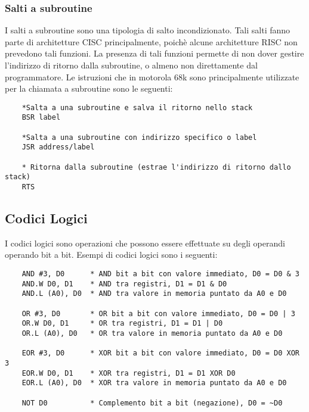 \newpage

\subsubsection{Salti a subroutine}
I salti a subroutine sono una tipologia di salto incondizionato. Tali salti fanno parte di architetture CISC principalmente, poichè alcune architetture RISC non prevedono tali funzioni. La presenza di tali funzioni permette di non dover gestire l'indirizzo di ritorno dalla subroutine, o almeno non direttamente dal programmatore. Le istruzioni che in motorola 68k sono principalmente utilizzate per la chiamata a subroutine sono le seguenti:
\begin{lstlisting}
    *Salta a una subroutine e salva il ritorno nello stack
    BSR label

    *Salta a una subroutine con indirizzo specifico o label
    JSR address/label

    * Ritorna dalla subroutine (estrae l'indirizzo di ritorno dallo stack)
    RTS
\end{lstlisting}

\subsection{Codici Logici}
I codici logici sono operazioni che possono essere effettuate su degli operandi operando bit a bit. Esempi di codici logici sono i seguenti:
\begin{lstlisting}
    AND #3, D0      * AND bit a bit con valore immediato, D0 = D0 & 3
    AND.W D0, D1    * AND tra registri, D1 = D1 & D0
    AND.L (A0), D0  * AND tra valore in memoria puntato da A0 e D0

    OR #3, D0       * OR bit a bit con valore immediato, D0 = D0 | 3
    OR.W D0, D1     * OR tra registri, D1 = D1 | D0
    OR.L (A0), D0   * OR tra valore in memoria puntato da A0 e D0

    EOR #3, D0      * XOR bit a bit con valore immediato, D0 = D0 XOR 3
    EOR.W D0, D1    * XOR tra registri, D1 = D1 XOR D0
    EOR.L (A0), D0  * XOR tra valore in memoria puntato da A0 e D0

    NOT D0          * Complemento bit a bit (negazione), D0 = ~D0
\end{lstlisting}

\newpage


